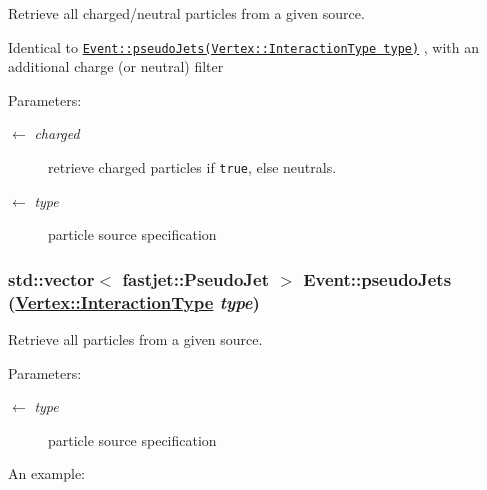 Retrieve all charged/neutral particles from a given source. 

Identical to {\tt \hyperlink{classEvent_387e8007b9b02f09cdc6bcbdfae839dd}{Event::pseudo\-Jets(Vertex::Interaction\-Type type)}} , with an additional charge (or neutral) filter

\begin{Desc}
\item[Parameters:]
\begin{description}
\item[\mbox{$\leftarrow$} {\em charged}]retrieve charged particles if {\tt true}, else neutrals. \item[\mbox{$\leftarrow$} {\em type}]particle source specification \end{description}
\end{Desc}
\hypertarget{classEvent_387e8007b9b02f09cdc6bcbdfae839dd}{
\subsubsection[pseudoJets]{\setlength{\rightskip}{0pt plus 5cm}std::vector$<$ fastjet::Pseudo\-Jet $>$ Event::pseudo\-Jets (\hyperlink{classVertex_0d80a5c5ed3bd9be72a325aa448eca25}{Vertex::Interaction\-Type} {\em type})}}
\label{classEvent_387e8007b9b02f09cdc6bcbdfae839dd}


Retrieve all particles from a given source. 

\begin{Desc}
\item[Parameters:]
\begin{description}
\item[\mbox{$\leftarrow$} {\em type}]particle source specification\end{description}
\end{Desc}
An example: 

